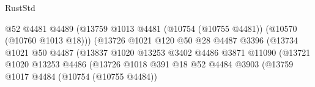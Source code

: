 \begin{lexlean}{RustStd}
\begin{coremodule}
                                                    @52
                                                    @4481
                                                    @4489
                                                    (@13759
                                                      @1013
                                                      @4481
                                                      (@10754 (@10755 @4481))
                                                      (@10570 (@10760 @1013 @18)))
                                                    (@13726
                                                      @1021
                                                      @120
                                                      @50
                                                      @28
                                                      @4487
                                                      @3396
                                                      (@13734
                                                        @1021
                                                        @50
                                                        @4487
                                                        (@13837
                                                          @1020
                                                          @13253
                                                          @3402
                                                          @4486
                                                          @3871
                                                          @11090
                                                          (@13721
                                                            @1020
                                                            @13253
                                                            @4486
                                                            (@13726
                                                              @1018
                                                              @391
                                                              @18
                                                              @52
                                                              @4484
                                                              @3903
                                                              (@13759
                                                                @1017
                                                                @4484
                                                                (@10754 (@10755 @4484))

\end{coremodule}
\end{lexlean}
